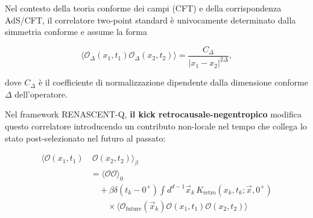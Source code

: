\documentclass[11pt,a4paper]{article}
\theoremstyle{plain}
\theoremstyle{definition}
\begin{document}
Nel contesto della teoria conforme dei campi (CFT) e della corrispondenza AdS/CFT, il correlatore two-point standard è univocamente determinato dalla simmetria conforme e assume la forma

\vspace{0.2cm}

\begin{tcolorbox}[
  colback=violet!3!white, 
  colframe=violet!70!black, 
  title=Correlatore two-point standard in CFT, 
  fonttitle=\bfseries,
  breakable,
  enhanced,
  width=\textwidth,
  boxrule=0.8pt,
  arc=5pt
]
\begin{equation}
\langle \mathcal{O}_{\Delta}(x_1,t_1) \mathcal{O}_{\Delta}(x_2,t_2) \rangle = \frac{C_{\Delta}}{|x_1 - x_2|^{2\Delta}},
\label{eq:two_point_standard}
\end{equation}
\end{tcolorbox}

\vspace{0.2cm}

dove $C_{\Delta}$ è il coefficiente di normalizzazione dipendente dalla dimensione conforme $\Delta$ dell'operatore.

\vspace{0.5cm}

Nel framework RENASCENT-Q, \textbf{il kick retrocausale-negentropico} modifica questo correlatore introducendo un contributo non-locale nel tempo che collega lo stato post-selezionato nel futuro al passato:

\vspace{0.2cm}



\begin{tcolorbox}[
  colback=cyan!3!white, 
  colframe=cyan!50!black, 
  title=Correlatore two-point retrocausale, 
  fonttitle=\bfseries,
  breakable,
  enhanced,
  width=\textwidth,
  boxrule=0.8pt,
  arc=5pt
]
\begin{equation}
\begin{aligned}
\langle \mathcal{O}(x_1,t_1) &\ \mathcal{O}(x_2,t_2) \rangle_{\beta} \\
&= \langle \mathcal{O} \mathcal{O} \rangle_0 \\
&\quad + \beta \delta(t_k-0^+) \int d^{d-1}\vec{x}_k \, 
K_{\text{retro}}(x_k,t_k;\vec{x},0^+) \\
&\qquad \times \langle \mathcal{O}_{\text{future}}(\vec{x}_k) \mathcal{O}(x_1,t_1) \mathcal{O}(x_2,t_2) \rangle
\end{aligned}
\label{eq:two_point_retro}
\end{equation}
\end{tcolorbox}
\end{document}
